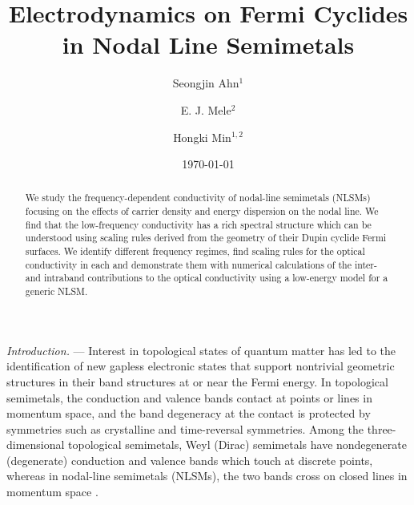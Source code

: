 \documentclass[aps,twocolumn,floatfix]{revtex4-1}
\begin{document}
\title{Electrodynamics on Fermi Cyclides in Nodal Line Semimetals}

\author{Seongjin Ahn$^{1}$}
\author{E. J. Mele$^2$}
\author{Hongki Min$^{1,2}$}

\date{\today}

\begin{abstract}
We study the frequency-dependent conductivity of nodal-line semimetals (NLSMs)
 focusing on the effects of carrier density and energy dispersion on the nodal line. We find that the low-frequency conductivity has a rich spectral structure which can be understood using scaling rules derived from the geometry of their Dupin cyclide Fermi surfaces. We identify different frequency regimes, find scaling rules for the optical conductivity in each and demonstrate them with numerical calculations of the inter- and intraband contributions to the optical conductivity using a low-energy model for a generic NLSM.
 \end{abstract}

\maketitle

{\em Introduction.} ---
Interest in topological states of quantum matter has led to the identification of new gapless electronic states that support nontrivial geometric structures in their band structures at or near the Fermi energy. In topological semimetals, the conduction and valence bands contact at points or lines in  momentum space, and the band degeneracy at the contact is protected by symmetries such as crystalline and time-reversal symmetries.  Among the three-dimensional topological semimetals, Weyl (Dirac) semimetals have nondegenerate (degenerate) conduction and valence bands which touch at discrete points, whereas in nodal-line semimetals (NLSMs), the two bands cross on closed lines in momentum space \cite{Burkov2011,Chiu2014,Fang2016,Rui2017}.
\end{document}
